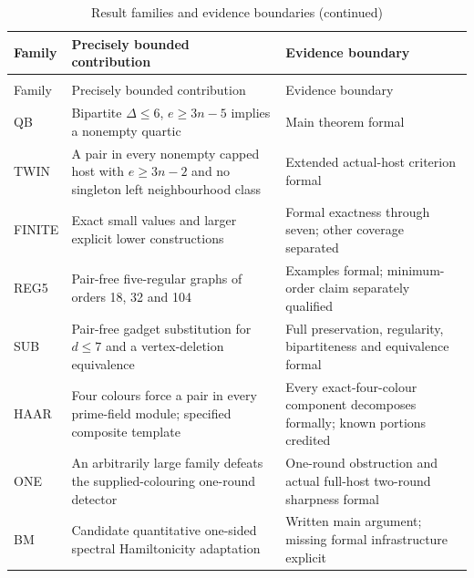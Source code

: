 \documentclass[smallextended]{svjour3}
\newcounter{none} %
\begin{document}
{
\begin{longtable}[]{@{}
  >{\raggedright\arraybackslash}p{}
  >{\raggedright\arraybackslash}p{}
  >{\raggedright\arraybackslash}p{}@{}}
\caption{Result families and evidence boundaries}\label{tab:family-map}\\
\toprule\noalign{}
\begin{minipage}[b]{\linewidth}\raggedright
Family
\end{minipage} & \begin{minipage}[b]{\linewidth}\raggedright
Precisely bounded contribution
\end{minipage} & \begin{minipage}[b]{\linewidth}\raggedright
Evidence boundary
\end{minipage} \\
\midrule\noalign{}
\endfirsthead
\caption[]{Result families and evidence boundaries (continued)}\\
\toprule\noalign{}
\begin{minipage}[b]{\linewidth}\raggedright
Family
\end{minipage} & \begin{minipage}[b]{\linewidth}\raggedright
Precisely bounded contribution
\end{minipage} & \begin{minipage}[b]{\linewidth}\raggedright
Evidence boundary
\end{minipage} \\
\midrule\noalign{}
\endhead
\bottomrule\noalign{}
\endlastfoot
QB & Bipartite \(\Delta\leq6\), \(e\geq3n-5\) implies a nonempty quartic
& Main theorem formal \\
TWIN & A pair in every nonempty capped host with \(e\geq3n-2\) and no
singleton left neighbourhood class & Extended actual-host criterion
formal \\
FINITE & Exact small values and larger explicit lower constructions &
Formal exactness through seven; other coverage separated \\
REG5 & Pair-free five-regular graphs of orders 18, 32 and 104 & Examples
formal; minimum-order claim separately qualified \\
SUB & Pair-free gadget substitution for \(d\leq7\) and a vertex-deletion
equivalence & Full preservation, regularity, bipartiteness and
equivalence formal \\
HAAR & Four colours force a pair in every prime-field module; specified
composite template & Every exact-four-colour component decomposes
formally; known portions credited \\
ONE & An arbitrarily large family defeats the supplied-colouring
one-round detector & One-round obstruction and actual full-host
two-round sharpness formal \\
BM & Candidate quantitative one-sided spectral Hamiltonicity adaptation
& Written main argument; missing formal infrastructure explicit \\
\end{longtable}
}
\end{document}
